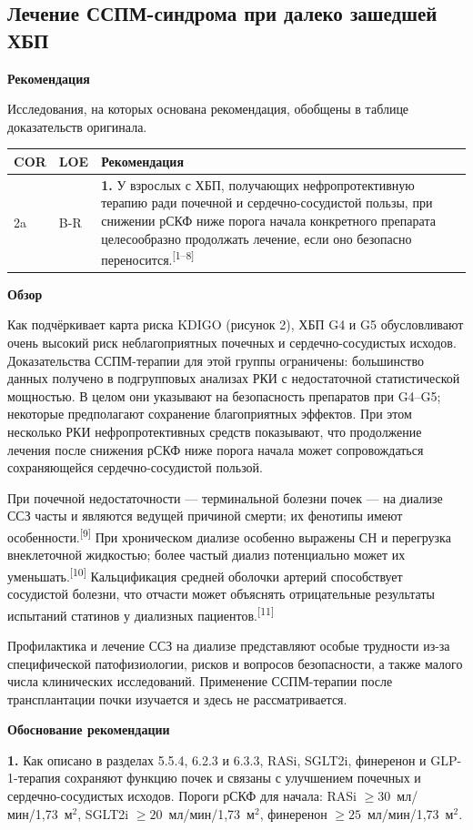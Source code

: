 \documentclass[11pt,a4paper]{article}
\newcommand{\src}[1]{\textsuperscript{[#1]}}
\newcommand{\heading}[1]{\par\medskip\textbf{#1}\par}
\newcommand{\unitgfr}{мл/мин/1,73~м$^2$}
\begin{document}
\subsection{Лечение ССПМ-синдрома при далеко зашедшей ХБП}
\heading{Рекомендация}
Исследования, на которых основана рекомендация, обобщены в таблице доказательств оригинала.
{\small
\begin{longtable}{P{0.07\textwidth}P{0.11\textwidth}P{0.75\textwidth}}
\toprule COR & LOE & Рекомендация\\\midrule
2a & B-R & \textbf{1.} У взрослых с ХБП, получающих нефропротективную терапию ради почечной и сердечно-сосудистой пользы, при снижении рСКФ ниже порога начала конкретного препарата целесообразно продолжать лечение, если оно безопасно переносится.\src{1--8}\\
\bottomrule
\end{longtable}
}
\heading{Обзор}
Как подчёркивает карта риска KDIGO (рисунок 2), ХБП G4 и G5 обусловливают очень высокий риск неблагоприятных почечных и сердечно-сосудистых исходов. Доказательства ССПМ-терапии для этой группы ограничены: большинство данных получено в подгрупповых анализах РКИ с недостаточной статистической мощностью. В целом они указывают на безопасность препаратов при G4--G5; некоторые предполагают сохранение благоприятных эффектов. При этом несколько РКИ нефропротективных средств показывают, что продолжение лечения после снижения рСКФ ниже порога начала может сопровождаться сохраняющейся сердечно-сосудистой пользой.

При почечной недостаточности --- терминальной болезни почек --- на диализе ССЗ часты и являются ведущей причиной смерти; их фенотипы имеют особенности.\src{9} При хроническом диализе особенно выражены СН и перегрузка внеклеточной жидкостью; более частый диализ потенциально может их уменьшать.\src{10} Кальцификация средней оболочки артерий способствует сосудистой болезни, что отчасти может объяснять отрицательные результаты испытаний статинов у диализных пациентов.\src{11}

Профилактика и лечение ССЗ на диализе представляют особые трудности из-за специфической патофизиологии, рисков и вопросов безопасности, а также малого числа клинических исследований. Применение ССПМ-терапии после трансплантации почки изучается и здесь не рассматривается.

\heading{Обоснование рекомендации}
\textbf{1.} Как описано в разделах 5.5.4, 6.2.3 и 6.3.3, RASi, SGLT2i, финеренон и GLP-1-терапия сохраняют функцию почек и связаны с улучшением почечных и сердечно-сосудистых исходов. Пороги рСКФ для начала: RASi $\geq30$~\unitgfr, SGLT2i $\geq20$~\unitgfr, финеренон $\geq25$~\unitgfr.
\end{document}
